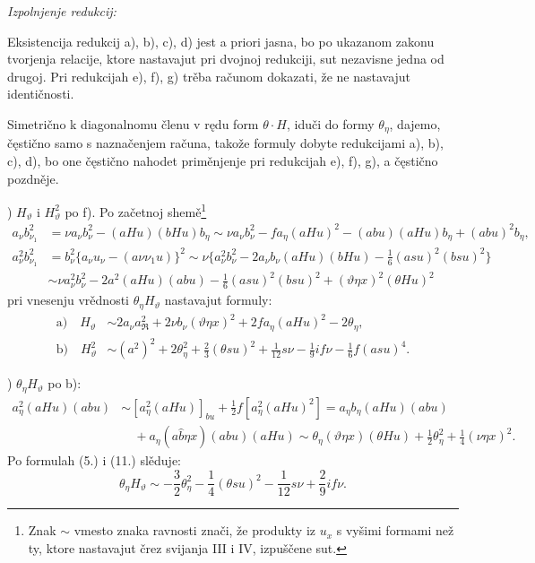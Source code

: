 \documentclass[11pt]{article}
\newcommand{\R}{\mathfrak R}
\begin{document}
\noindent\textit{Izpolnjenje redukcij:}

Eksistencija redukcij \mbox{a)}, \mbox{b)}, \mbox{c)}, \mbox{d)} jest a priori jasna, bo po ukazanom zakonu tvorjenja relacije, ktore nastavajut pri dvojnoj redukciji, sut nezavisne jedna od drugoj. Pri redukcijah \mbox{e)}, \mbox{f)}, \mbox{g)} trěba računom dokazati, že ne nastavajut identičnosti.

Simetrično k diagonalnomu členu v rędu form $\theta\cdot H$, iduči do formy $\theta_\eta$, dajemo, čęstično samo s naznačenjem računa, takože formuly dobyte redukcijami \mbox{a)}, \mbox{b)}, \mbox{c)}, \mbox{d)}, bo one čęstično nahodet priměnjenje pri redukcijah \mbox{e)}, \mbox{f)}, \mbox{g)}, a čęstično pozdněje.

) $H_\vartheta$ i $H_\vartheta^2$ po \mbox{f)}. Po začetnoj shemě\footnote{Znak $\sim$ vmesto znaka ravnosti znači, že produkty iz $u_x$ s vyšimi formami než ty, ktore nastavajut črez svijanja III i IV, izpuščene sut.}
\begingroup\small
\[
\begin{aligned}
a_\nu b_{\nu_1}^2
&=\nu a_\nu b_\nu^2-(aHu)(bHu)b_\eta
\sim \nu a_\nu b_\nu^2-f a_\eta(aHu)^2-(abu)(aHu)b_\eta+(abu)^2b_\eta,\\
a_\nu^2b_{\nu_1}^2
&=b_\nu^2\{a_\nu u_\nu-(a\nu\nu_1u)\}^2
\sim \nu\{a_\nu^2b_\nu^2-2a_\nu b_\nu(aHu)(bHu)
-\frac16(asu)^2(bsu)^2\}\\
&\sim \nu a_\nu^2b_\nu^2-2a^2(aHu)(abu)-\frac16(asu)^2(bsu)^2+(\vartheta\eta x)^2(\theta Hu)^2
\end{aligned}
\]
\endgroup
pri vnesenju vrědnosti $\theta_\eta H_\vartheta$ nastavajut formuly:
\[
\tag{12}
\begin{aligned}
\mathrm{a)}\quad H_\vartheta&\sim 2a_\nu a_\R^2+2\nu b_\nu(\vartheta\eta x)^2+2f a_\eta(aHu)^2-2\theta_\eta,\\
\mathrm{b)}\quad H_\vartheta^2&\sim (a^2)^2+2\theta_\eta^2+\frac23(\theta su)^2
+\frac1{12}s\nu-\frac19if\nu-\frac16f(asu)^4.
\end{aligned}
\]

) $\theta_\eta H_\vartheta$ po \mbox{b)}:
\begingroup\small
\[
\begin{aligned}
a_\eta^2(aHu)(abu)&\sim [a_\eta^2(aHu)]_{bu}+\frac12 f[a_\eta^2(aHu)^2]
=a_\eta b_\eta(aHu)(abu)\\
&\quad+a_\eta(a\widehat{b}\eta x)(abu)(aHu)
\sim \theta_\eta(\vartheta\eta x)(\theta Hu)+\frac12\theta_\eta^2+\frac14(\nu\eta x)^2.
\end{aligned}
\]
\endgroup
Po formulah (5.) i (11.) slěduje:
\[
\theta_\eta H_\vartheta\sim -\frac32\theta_\eta^2-\frac14(\theta su)^2-\frac1{12}s\nu+\frac29if\nu.
\]
\end{document}
